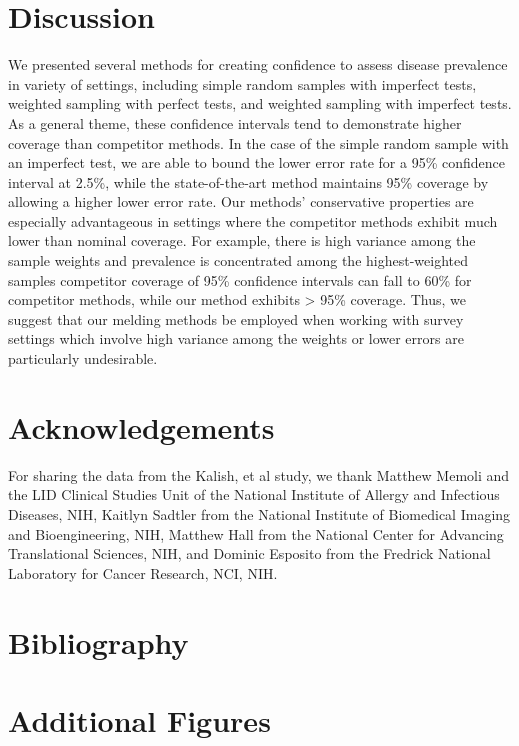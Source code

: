 \documentclass[AMA,STIX1COL]{WileyNJD-v2}
\begin{document}
\section{Discussion}

We presented several methods for creating confidence to assess disease prevalence in variety of settings, including simple random samples with imperfect tests, weighted sampling with perfect tests, and weighted sampling with imperfect tests.
As a general theme, these confidence intervals tend to demonstrate higher coverage than competitor methods.
In the case of the simple random sample with an imperfect test, we are able to bound the lower error rate for a 95\% confidence interval at 2.5\%, while the state-of-the-art method maintains 95\% coverage by allowing a higher lower error rate.
Our methods' conservative properties are especially advantageous in settings where the competitor methods exhibit much lower than nominal coverage.
For example, there is high variance among the sample weights and prevalence is concentrated among the highest-weighted samples competitor coverage of 95\% confidence intervals can fall to 60\% for competitor methods, while our method exhibits > 95\% coverage.
Thus, we suggest that our melding methods be employed when working with survey settings which involve high variance among the weights or lower errors are particularly undesirable.

\section{Acknowledgements}
For sharing the data from the Kalish, et al study, we thank Matthew Memoli and the LID Clinical Studies Unit of the National Institute of Allergy and Infectious Diseases, NIH,  Kaitlyn Sadtler from the National Institute of Biomedical Imaging and Bioengineering, NIH,   Matthew Hall from the National Center for Advancing Translational Sciences, NIH, and Dominic Esposito from the Fredrick National Laboratory for Cancer Research, NCI, NIH.

\section{Bibliography}
\nocite{*}%
%

\appendix
\section{Additional Figures}
\end{document}
